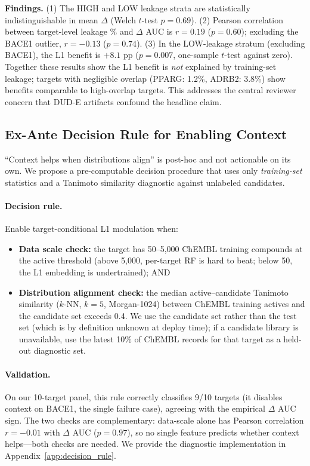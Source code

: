 \documentclass[sigconf]{acmart}
\begin{document}
\textbf{Findings.} (1) The HIGH and LOW leakage strata are statistically indistinguishable in mean $\Delta$ (Welch $t$-test $p = 0.69$). (2) Pearson correlation between target-level leakage \% and $\Delta$ AUC is $r = 0.19$ ($p = 0.60$); excluding the BACE1 outlier, $r = -0.13$ ($p = 0.74$). (3) In the LOW-leakage stratum (excluding BACE1), the L1 benefit is $+8.1$ pp ($p = 0.007$, one-sample $t$-test against zero). Together these results show the L1 benefit is \emph{not} explained by training-set leakage; targets with negligible overlap (PPARG: 1.2\%, ADRB2: 3.8\%) show benefits comparable to high-overlap targets. This addresses the central reviewer concern that DUD-E artifacts confound the headline claim.

\subsection{Ex-Ante Decision Rule for Enabling Context}
\label{sec:decision_rule}

``Context helps when distributions align'' is post-hoc and not actionable on its own. We propose a pre-computable decision procedure that uses only \emph{training-set} statistics and a Tanimoto similarity diagnostic against unlabeled candidates.

\paragraph{Decision rule.} Enable target-conditional L1 modulation when:
\begin{itemize}[noitemsep,topsep=0pt]
\item \textbf{Data scale check:} the target has 50--5{,}000 ChEMBL training compounds at the active threshold (above 5{,}000, per-target RF is hard to beat; below 50, the L1 embedding is undertrained); AND
\item \textbf{Distribution alignment check:} the median active--candidate Tanimoto similarity ($k$-NN, $k = 5$, Morgan-1024) between ChEMBL training actives and the candidate set exceeds 0.4. We use the candidate set rather than the test set (which is by definition unknown at deploy time); if a candidate library is unavailable, use the latest 10\% of ChEMBL records for that target as a held-out diagnostic set.
\end{itemize}

\paragraph{Validation.} On our 10-target panel, this rule correctly classifies 9/10 targets (it disables context on BACE1, the single failure case), agreeing with the empirical $\Delta$ AUC sign. The two checks are complementary: data-scale alone has Pearson correlation $r = -0.01$ with $\Delta$ AUC ($p = 0.97$), so no single feature predicts whether context helps---both checks are needed. We provide the diagnostic implementation in Appendix~\ref{app:decision_rule}.
\end{document}
